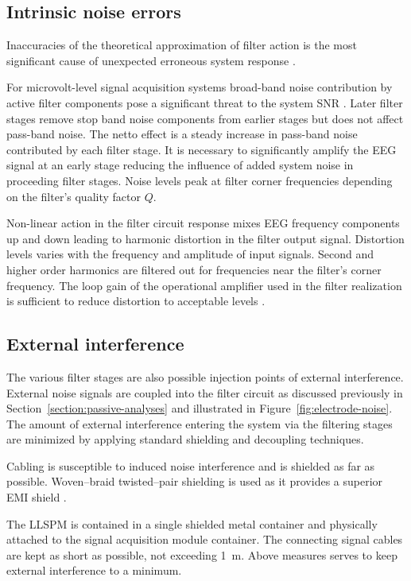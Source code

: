 \subsection{Intrinsic noise errors}
Inaccuracies of the theoretical approximation of filter action is the
most significant cause of unexpected erroneous system response
\cite[p18]{design-guide}.

For microvolt-level signal acquisition systems broad-band noise
contribution by active filter components pose a significant threat to
the system SNR \cite[p38]{mvl-data}. Later filter stages remove stop
band noise components from earlier stages but does not affect
pass-band noise. The netto effect is a steady increase in pass-band
noise contributed by each filter stage. It is necessary to
significantly amplify the EEG signal at an early stage reducing the
influence of added system noise in proceeding filter stages. Noise
levels peak at filter corner frequencies depending on the filter's
quality factor $Q$.

Non-linear action in the filter circuit response mixes EEG frequency
components up and down leading to harmonic distortion in the filter
output signal. Distortion levels varies with the frequency and
amplitude of input signals. Second and higher order harmonics are
filtered out for frequencies near the filter's corner frequency. The
loop gain of the operational amplifier used in the filter realization
is sufficient to reduce distortion to acceptable levels
\cite[20]{design-guide}.


\subsection{External interference}
The various filter stages are also possible injection points of
external interference. External noise signals are coupled into the
filter circuit as discussed previously in
Section~\vref{section:passive-analyses} and illustrated in
Figure~\vref{fig:electrode-noise}. The amount of external interference
entering the system via the filtering stages are minimized by applying
standard shielding and decoupling techniques.

Cabling is susceptible to induced noise interference and is shielded
as far as possible. Woven--braid twisted--pair shielding is used as it
provides a superior EMI shield \cite[39]{mvl-data}.

The LLSPM is contained in a single shielded metal container and
physically attached to the signal acquisition module container. The
connecting signal cables are kept as short as possible, not exceeding
1~m. Above measures serves to keep external interference to a minimum.


